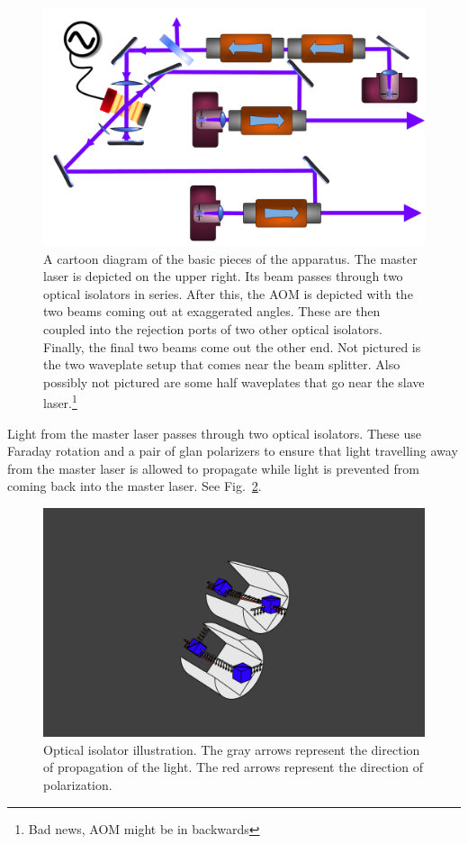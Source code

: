\begin{figure}
    \centerline{\includegraphics[width=1\textwidth]{diagramOfSetup3}}
    \caption[Diagram of the Setup]{\label{figdiagramOfSetup}
	A cartoon diagram of the basic pieces of the apparatus. The master laser is depicted on the upper right. Its beam passes through two optical isolators in series. After this, the AOM is depicted with the two beams coming out at exaggerated angles. These are then coupled into the rejection ports of two other optical isolators. Finally, the final two beams come out the other end. Not pictured is the two waveplate setup that comes near the beam splitter. Also possibly not pictured are some half waveplates that go near the slave laser.\footnote{Bad news, AOM might be in backwards} 
    }
\end{figure}

Light from the master laser passes through two optical isolators. These use Faraday rotation and a pair of glan polarizers to ensure that light travelling away from the master laser is allowed to propagate while light is prevented from coming back into the master laser. See Fig.~\ref{isolatorPicture}.

\begin{figure}
\label{isolatorPicture}
\centerline{\includegraphics[width=1\textwidth]{isolators}}
\caption[Optical Isolator Illustration]{Optical isolator illustration. The gray arrows represent the direction of propagation of the light. The red arrows represent the direction of polarization.}
\end{figure}

